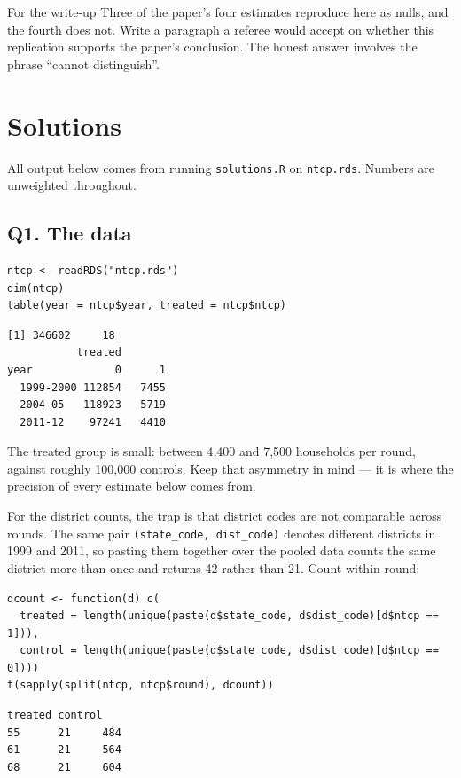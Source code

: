 \documentclass[11pt,a4paper]{article}
\newcommand{\qhead}[1]{\subsection*{#1}\addcontentsline{toc}{subsection}{#1}}
\begin{document}
\begin{notebox}{For the write-up}
Three of the paper's four estimates reproduce here as nulls, and the fourth
does not. Write a paragraph a referee would accept on whether this replication
supports the paper's conclusion. The honest answer involves the phrase
``cannot distinguish''.
\end{notebox}

\clearpage
\section*{Solutions}

All output below comes from running \texttt{solutions.R} on
\texttt{ntcp.rds}. Numbers are unweighted throughout.

\qhead{Q1. The data}

\begin{lstlisting}[style=rcode]
ntcp <- readRDS("ntcp.rds")
dim(ntcp)
table(year = ntcp$year, treated = ntcp$ntcp)
\end{lstlisting}

\begin{lstlisting}[style=rout]
[1] 346602     18
           treated
year             0      1
  1999-2000 112854   7455
  2004-05   118923   5719
  2011-12    97241   4410
\end{lstlisting}

The treated group is small: between 4{,}400 and 7{,}500 households per round,
against roughly 100{,}000 controls. Keep that asymmetry in mind --- it is where
the precision of every estimate below comes from.

For the district counts, the trap is that district codes are not comparable
across rounds. The same pair \texttt{(state\_code, dist\_code)} denotes
different districts in 1999 and 2011, so pasting them together over the pooled
data counts the same district more than once and returns 42 rather than 21.
Count within round:

\begin{lstlisting}[style=rcode]
dcount <- function(d) c(
  treated = length(unique(paste(d$state_code, d$dist_code)[d$ntcp == 1])),
  control = length(unique(paste(d$state_code, d$dist_code)[d$ntcp == 0])))
t(sapply(split(ntcp, ntcp$round), dcount))
\end{lstlisting}

\begin{lstlisting}[style=rout]
   treated control
55      21     484
61      21     564
68      21     604
\end{lstlisting}
\end{document}
